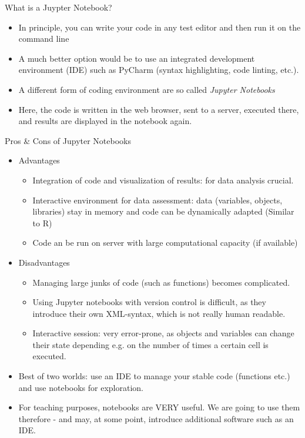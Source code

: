 \begin{frame}{What is a Juypter Notebook?}

	\begin{itemize}
		\item In principle, you can write your code in any test editor and then run it on the command line
		\item A much better option would be to use an integrated development environment (IDE) such
            as PyCharm (syntax highlighting, code linting, etc.).
		\item A different form of coding environment are so called \textit{Jupyter Notebooks}
		\item Here, the code is written in the web browser, sent to a server, executed there, and results are displayed in the notebook again.

	\end{itemize}


\end{frame}

\begin{frame}{Pros \& Cons of Jupyter Notebooks}

\begin{itemize}
		\item Advantages
	\begin{itemize}
		\item Integration of code and visualization of results: for data analysis crucial.
		\item Interactive environment for data assessment: data (variables, objects, libraries) stay in memory and code can be dynamically adapted (Similar to R)
		\item Code an be run on server with large computational capacity (if available)

	\end{itemize}
	\item Disadvantages
	\begin{itemize}
		\item Managing large junks of code (such as functions) becomes complicated.
		\item Using Jupyter notebooks with version control is difficult, as they introduce their own XML-syntax, which is not really human readable.
		\item Interactive session: very error-prone, as objects and variables can change their state depending e.g. on the number of times a certain cell is executed.
	\end{itemize}

	\item Best of two worlds: use an IDE to manage your stable code (functions etc.) and use notebooks for exploration.
	\item For teaching purposes, notebooks are VERY useful. We are going to use them therefore - and may, at some point, introduce additional software such as an IDE.
\end{itemize}

\end{frame}

